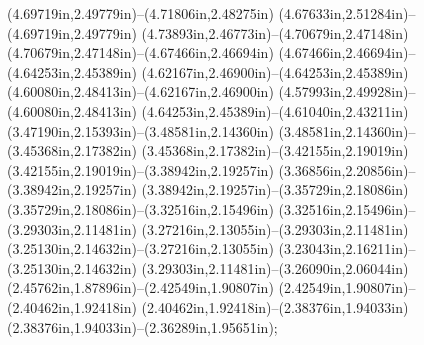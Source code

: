 (4.69719in,2.49779in)--(4.71806in,2.48275in) (4.67633in,2.51284in)--(4.69719in,2.49779in) (4.73893in,2.46773in)--(4.70679in,2.47148in) (4.70679in,2.47148in)--(4.67466in,2.46694in) (4.67466in,2.46694in)--(4.64253in,2.45389in) (4.62167in,2.46900in)--(4.64253in,2.45389in) (4.60080in,2.48413in)--(4.62167in,2.46900in) (4.57993in,2.49928in)--(4.60080in,2.48413in) (4.64253in,2.45389in)--(4.61040in,2.43211in) (3.47190in,2.15393in)--(3.48581in,2.14360in) (3.48581in,2.14360in)--(3.45368in,2.17382in) (3.45368in,2.17382in)--(3.42155in,2.19019in) (3.42155in,2.19019in)--(3.38942in,2.19257in) (3.36856in,2.20856in)--(3.38942in,2.19257in) (3.38942in,2.19257in)--(3.35729in,2.18086in) (3.35729in,2.18086in)--(3.32516in,2.15496in) (3.32516in,2.15496in)--(3.29303in,2.11481in) (3.27216in,2.13055in)--(3.29303in,2.11481in) (3.25130in,2.14632in)--(3.27216in,2.13055in) (3.23043in,2.16211in)--(3.25130in,2.14632in) (3.29303in,2.11481in)--(3.26090in,2.06044in) (2.45762in,1.87896in)--(2.42549in,1.90807in) (2.42549in,1.90807in)--(2.40462in,1.92418in) (2.40462in,1.92418in)--(2.38376in,1.94033in) (2.38376in,1.94033in)--(2.36289in,1.95651in);
